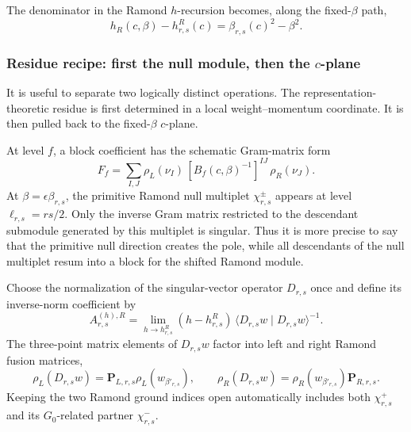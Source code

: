 \documentclass[11pt]{article}
\begin{document}
The denominator in the Ramond \(h\)-recursion becomes, along the
fixed-\(\beta\) path,
\begin{equation}
 h_R(c,\beta)-h^R_{r,s}(c)
 =
 \beta_{r,s}(c)^2-\beta^2.
 \label{eq:fixed-beta-denominator}
\end{equation}

\subsubsection{\texorpdfstring{Residue recipe: first the null module, then the
\(c\)-plane}{Residue recipe: first the null module, then the c-plane}}

It is useful to separate two logically distinct operations.  The
representation-theoretic residue is first determined in a local
weight--momentum coordinate.  It is then pulled back to the fixed-\(\beta\)
\(c\)-plane.

At level \(f\), a block coefficient has the schematic Gram-matrix form
\begin{equation}
 F_f
 =
 \sum_{I,J}
 \rho_L(\nu_I)\,
 [B_f(c,\beta)^{-1}]^{IJ}\,
 \rho_R(\nu_J).
 \label{eq:fixed-beta-gram-coefficient}
\end{equation}
At \(\beta=\epsilon\beta_{r,s}\), the primitive Ramond null multiplet
\(\chi^\pm_{r,s}\) appears at level
\(\ell_{r,s}=rs/2\).  Only the inverse Gram matrix restricted to the
descendant submodule generated by this multiplet is singular.  Thus it is
more precise to say that the primitive null direction creates the pole,
while all descendants of the null multiplet resum into a block for the
shifted Ramond module.

Choose the normalization of the singular-vector operator \(D_{r,s}\) once
and define its inverse-norm coefficient by
\begin{equation}
 A^{(h),R}_{r,s}
 =
 \lim_{h\to h^R_{r,s}}
 (h-h^R_{r,s})\,
 \langle D_{r,s}w\mid D_{r,s}w\rangle^{-1}.
 \label{eq:fixed-beta-null-norm}
\end{equation}
The three-point matrix elements of \(D_{r,s}w\) factor into left and right
Ramond fusion matrices,
\begin{equation}
 \rho_L(D_{r,s}w)=\mathbf P_{L,r,s}\rho_L(w_{\beta'_{r,s}}),
 \qquad
 \rho_R(D_{r,s}w)=\rho_R(w_{\beta'_{r,s}})
 \mathbf P_{R,r,s}.
 \label{eq:fixed-beta-fusion-factorization}
\end{equation}
Keeping the two Ramond ground indices open automatically includes both
\(\chi^+_{r,s}\) and its \(G_0\)-related partner \(\chi^-_{r,s}\).
\end{document}
